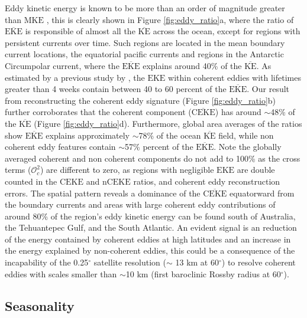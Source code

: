 \documentclass[draft,linenumbers]{agujournal2019}
\newcommand{\MKE}{\overline{\textrm{KE}}}
\newcommand{\mKE}{\textrm{MKE}}
\newcommand{\MEKE}{\overline{\textrm{EKE}}}
\newcommand{\EKE}{\textrm{EKE}}
\newcommand{\MCEKE}{\overline{\textrm{CEKE}}}
\newcommand{\CEKE}{\textrm{CEKE}}
\newcommand{\nCEKE}{\textrm{nCEKE}}
\begin{document}
	Eddy kinetic energy is known to be more than an order of magnitude greater than $\mKE$ \citep{Gill_Energy_1974}, this is clearly shown in Figure \ref{fig:eddy_ratio}a, where the ratio of $\MEKE$ is responsible of almost all the $\MKE$ across the ocean, except for regions with persistent currents over time. 
	Such regions are located in the mean boundary current locations, the equatorial pacific currents and regions in the Antarctic Circumpolar current, where the $\MEKE$ explains around 40\% of the $\MKE$. 
	As estimated by a previous study by \citet{Chelton_The_2011}, the $\EKE$ within coherent eddies with lifetimes greater than 4 weeks contain between 40 to 60 percent of the $\MEKE$. 
	Our result from reconstructing the coherent eddy signature (Figure \ref{fig:eddy_ratio}b) further corroborates that the coherent component ($\MCEKE$) has around $\sim$48\% of the $\MKE$ (Figure \ref{fig:eddy_ratio}d). 
	Furthermore, global area averages of the ratios show $\MEKE$ explains approximately $\sim$78\% of the ocean $\MKE$ field, while non coherent eddy features contain $\sim$57\% percent of the $\MEKE$. 
	Note the globally averaged coherent and non coherent components do not add to 100\% as the cross terms ($\mathcal{O}_c^2$) are different to zero, as regions with negligible $\EKE$ are double counted in the $\CEKE$ and $\nCEKE$ ratios, and coherent eddy reconstruction errors.
	The spatial pattern reveals a dominance of the $\MCEKE$ equatorward from the boundary currents and areas with large coherent eddy contributions of around 80\% of the region's eddy kinetic energy can be found south of Australia, the Tehuantepec Gulf, and the South Atlantic. 
	An evident signal is an reduction of the energy contained by coherent eddies at high latitudes and an increase in the energy explained by non-coherent eddies, this could be a consequence of the incapability of the 0.25$^\circ$ satellite resolution ($\sim$ 13 km at 60$^\circ$) to resolve coherent eddies with scales smaller than $\sim$10 km (first baroclinic Rossby radius at 60$^\circ$).

	\subsection{Seasonality}

\end{document}
